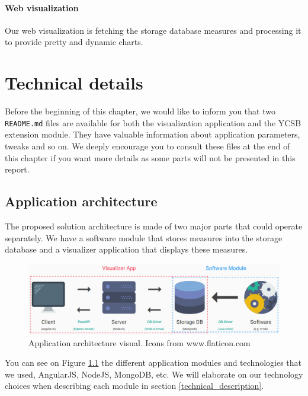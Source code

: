 \documentclass[a4paper,11pt]{report}
\begin{document}
\subsubsection{Web visualization}

Our web visualization is fetching the storage database measures and processing it to provide pretty and dynamic charts.

\clearpage

\chapter{Technical details}\label{techical_chapter}

Before the beginning of this chapter, we would like to inform you that two \texttt{README.md} files are available for both the visualization application and the YCSB extension module. They have valuable information about application parameters, tweaks and so on. We deeply encourage you to consult these files at the end of this chapter if you want more details as some parts will not be presented in this report.

\section{Application architecture}\label{app_archi_section}

The proposed solution architecture is made of two major parts that could operate separately. We have a software module that stores measures into the storage database and a visualizer application that displays these measures.

\begin{figure}[ht]
\begin{center}
\includegraphics[width=1\linewidth]{images/archi_small_complete.png}
\caption{Application architecture visual. Icons from www.flaticon.com}
\label{app_archi_fig}
\end{center}
\end{figure}

You can see on Figure \ref{app_archi_fig} the different application modules and technologies that we used, AngularJS, NodeJS, MongoDB, etc. We will elaborate on our technology choices when describing each module in section \ref{technical_description}. 
\end{document}
